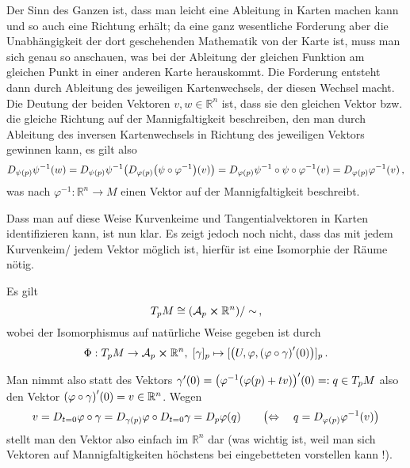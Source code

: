 \documentclass[../H_Analysis_main.tex]{subfiles}
\begin{document}
Der Sinn des Ganzen ist, dass man leicht eine Ableitung in Karten machen kann und so auch eine Richtung erhält; da eine ganz wesentliche Forderung aber die Unabhängigkeit der dort geschehenden Mathematik von der Karte ist, muss man sich genau so anschauen, was bei der Ableitung der gleichen Funktion am gleichen Punkt in einer anderen Karte herauskommt. Die Forderung entsteht dann durch Ableitung des jeweiligen Kartenwechsels, der diesen Wechsel macht. Die Deutung der beiden Vektoren $v, w \in \mathbb{R}^n$ ist, dass sie den gleichen Vektor bzw. die gleiche Richtung auf der Mannigfaltigkeit beschreiben, den man durch Ableitung des inversen Kartenwechsels in Richtung des jeweiligen Vektors gewinnen kann, es gilt also
\begin{equation*}
%
D_{\psi(p)} \psi^{-1}(w) = D_{\psi(p)} \psi^{-1}\qty(D_{\varphi(p)} \qty(\psi \circ \varphi^{-1})(v)) = D_{\varphi(p)} \psi^{-1} \circ \psi \circ \varphi^{-1}(v) = D_{\varphi(p)} \varphi^{-1}(v) \, ,
\end{equation*}
was nach $\varphi^{-1}: \mathbb{R}^n \rightarrow M$ einen Vektor auf der Mannigfaltigkeit beschreibt. 


Dass man auf diese Weise Kurvenkeime und Tangentialvektoren in Karten identifizieren kann, ist nun klar. Es zeigt jedoch noch nicht, dass das mit jedem Kurvenkeim/ jedem Vektor möglich ist, hierfür ist eine Isomorphie der Räume nötig.

\begin{satz}
Es gilt
\begin{equation}
T_p M \cong \qty(\mathcal{A}_p \cross \mathbb{R}^n)/ \sim \, ,
\end{equation}
wobei der Isomorphismus auf natürliche Weise gegeben ist durch
\begin{equation}
\Phi: T_p M \rightarrow \mathcal{A}_p \cross \mathbb{R}^n, \; [\gamma]_p \mapsto [\qty(U, \varphi, \qty(\varphi \circ \gamma)'(0))]_p \, .
\end{equation}
\end{satz}
Man nimmt also statt des Vektors $\gamma'(0) = \qty(\varphi^{-1}(\varphi(p) + t v))'(0) =: q \in T_p M$ also den Vektor $\qty(\varphi \circ \gamma)'(0) = v \in \mathbb{R}^n$. Wegen
\begin{equation*}
v = D_{t = 0} \varphi \circ \gamma = D_{\gamma(p)} \varphi \circ D_{t = 0} \gamma = D_p \varphi(q) \qquad \qty(\Leftrightarrow \quad q = D_{\varphi(p)} \varphi^{-1}(v))
\end{equation*}
stellt man den Vektor also einfach im $\mathbb{R}^n$ dar (was wichtig ist, weil man sich Vektoren auf Mannigfaltigkeiten höchstens bei eingebetteten vorstellen kann !).
\end{document}
